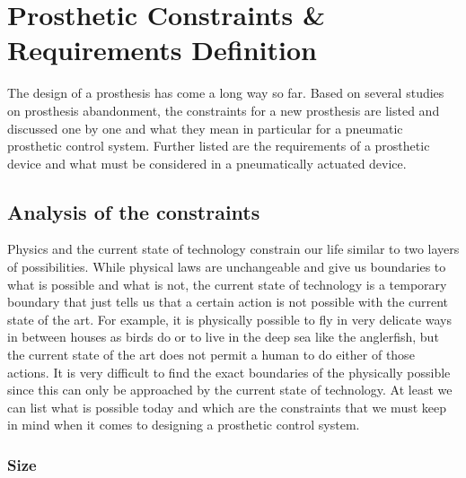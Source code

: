 \documentclass[main]{subfiles}
\begin{document}
\chapter{Prosthetic Constraints \& Requirements Definition} %

\label{Chapter3} %


The design of a prosthesis has come a long way so far. Based on several studies on prosthesis abandonment, the constraints for a new prosthesis are listed and discussed one by one and what they mean in particular for a pneumatic prosthetic control system. Further listed are the requirements of a prosthetic device and what must be considered in a pneumatically actuated device.


\section{Analysis of the constraints}
Physics and the current state of technology constrain our life similar to two layers of possibilities. While physical laws are unchangeable and give us boundaries to what is possible and what is not, the current state of technology is a temporary boundary that just tells us that a certain action is not possible with the current state of the art. For example, it is physically possible to fly in very delicate ways in between houses as birds do or to live in the deep sea like the anglerfish, but the current state of the art does not permit a human to do either of those actions. It is very difficult to find the exact boundaries of the physically possible since this can only be approached by the current state of technology. At least we can list what is possible today and which are the constraints that we must keep in mind when it comes to designing a prosthetic control system.

\subsection{Size}
\end{document}
